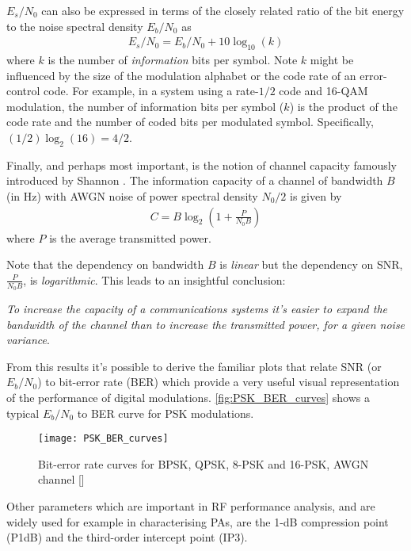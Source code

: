 $E_s/N_0$ can also be expressed in terms of the closely related ratio of the bit energy to the noise spectral density $E_b/N_0$ as
\begin{align}
  \label{eq:esn0}
  E_s/N_0 = E_b/N_0 + 10\log_{10}(k)
\end{align}
where $k$ is the number of \emph{information} bits per symbol. Note $k$ might be influenced by the size of the modulation alphabet or the code rate of an error-control code. For example, in a system using a rate-$1/2$ code and 16-QAM modulation, the number of information bits per symbol ($k$) is the product of the code rate and the number of coded bits per modulated symbol. Specifically, $(1/2) \log_2(16) = 4/2$.

Finally, and perhaps most important, is the notion of channel capacity famously introduced by Shannon \cite{shannon_capacity}. The information capacity of a channel of bandwidth $B$ (in Hz) with AWGN noise of power spectral density $N_0/2$ is given by
\begin{align}
  C = B\log_{2}\left(1+\frac{P}{N_0 B}\right)
\end{align}
where $P$ is the average transmitted power.

Note that the dependency on bandwidth $B$ is \emph{linear} but the dependency on SNR, $\frac{P}{N_0 B}$, is \emph{logarithmic}. This leads to an insightful conclusion:

\begin{displayquote}
  \emph{To increase the capacity of a communications systems it's easier to expand the bandwidth of the channel than to increase the transmitted power, for a given noise variance}.
\end{displayquote}

From this results it's possible to derive the familiar plots that relate SNR (or $E_b/N_0$) to bit-error rate (BER) which provide a very useful visual representation of the performance of digital modulations. \autoref{fig:PSK_BER_curves} shows a typical $E_b/N_0$ to BER curve for PSK modulations.

\begin{figure}[ht]
  \centering
  \texttt{[image: PSK\_BER\_curves]}
  \caption{Bit-error rate curves for BPSK, QPSK, 8-PSK and 16-PSK, AWGN channel [\citeauthor{image:ber_curve}]}
  \label{fig:PSK_BER_curves}
\end{figure}

Other parameters which are important in RF performance analysis, and are widely used for example in characterising PAs, are the 1-dB compression point (P1dB) and the third-order intercept point (IP3).

